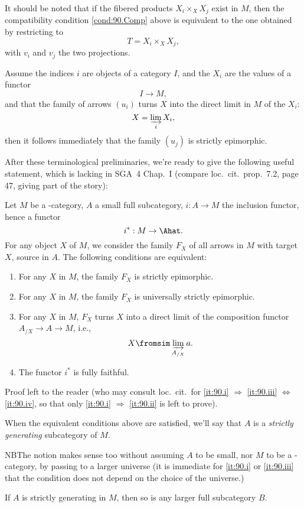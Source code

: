 It should be noted that if the fibered products $X_i\times_X X_j$
exist in $M$, then the compatibility condition \ref{cond:90.Comp}
above is equivalent to the one obtained by restricting to
\[T = X_i\times_X X_j,\]
with $v_i$ and $v_j$ the two projections.

Assume the indices $i$ are objects of a category $I$, and the $X_i$
are the values of a functor
\[I\to M,\]
and that the family of arrows $(u_i)$ turns $X$ into the direct limit
in $M$ of the $X_i$:
\[X=\varinjlim_i X_i,\]
then it follows immediately that the family $(u_j)$ is strictly
epimorphic.

After these terminological preliminaries, we're ready to give
the following useful statement, which is lacking in
SGA~4 
Chap.~I (compare loc.\ cit.\ prop.\ 7.2, page 47, giving part of the
story):
\begin{proposition}
  Let $M$ be a \scrU-category, $A$ a small full subcategory, $i:A\to
  M$ the inclusion functor, hence a functor
  \[i^*:M\to \Ahat.\]
  For any object $X$ of $M$, we consider the family $F_X$ of all
  arrows in $M$ with target $X$, source in $A$\kern1pt. The following
  conditions are equivalent:
  \begin{enumerate}[label=(\roman*),font=\normalfont]
  \item\label{it:90.i}
    For any $X$ in $M$, the family $F_X$ is strictly epimorphic.
  \item\label{it:90.ii}
    For any $X$ in $M$, the family $F_X$ is universally strictly
    epimorphic.
  \item\label{it:90.iii}
    For any $X$ in $M$, $F_X$ turns $X$ into a direct limit of the
    composition functor $A_{/X}\to A\to M$, i.e.,
    \[X \fromsim \varinjlim_{A_{/X}} a.\]
  \item\label{it:90.iv}
    The functor $i^*$ is fully faithful.
  \end{enumerate}
\end{proposition}

Proof left to the reader (who may consult loc.\ cit.\ for
\ref{it:90.i} $\Rightarrow$ \ref{it:90.iii} $\Leftrightarrow$
\ref{it:90.iv}, so that only \ref{it:90.i} $\Rightarrow$
\ref{it:90.ii} is left to prove).
\begin{definition}
  When the equivalent conditions above are satisfied, we'll say that
  $A$ is a \emph{strictly generating} subcategory of $M$.
\end{definition}

NB\enspace The notion makes sense too without assuming $A$ to be
small, nor $M$ to be a \scrU-category, by passing to a larger universe
(it is immediate for \ref{it:90.i} or \ref{it:90.iii} that the
condition does not depend on the choice of the universe.)
\begin{corollary}
  If $A$ is strictly generating in $M$, then so is any larger full
  subcategory $B$.
\end{corollary}

